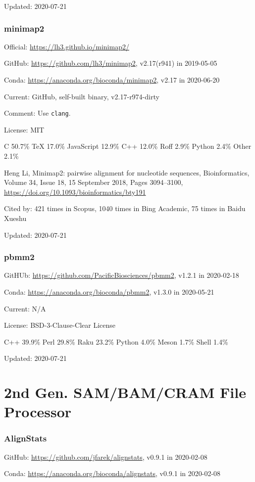 \documentclass[]{article}
\newcommand{\cb}[3]{\par Cited by: {\color{blue}\Huge #1} times in Scopus, {\color{blue}\Huge #2} times in Bing Academic, {\color{blue}\Huge #3} times in Baidu Xueshu}
\begin{document}
Updated: 2020-07-21

\section{minimap2}

Official: \url{https://lh3.github.io/minimap2/}

GitHub: \url{https://github.com/lh3/minimap2}, v2.17(r941) in 2019-05-05

Conda: \url{https://anaconda.org/bioconda/minimap2}, v2.17 in 2020-06-20

Current: GitHub, self-built binary, v2.17-r974-dirty

Comment: Use \verb|clang|.

License: MIT

C 50.7\% TeX 17.0\% JavaScript 12.9\% C++ 12.0\% Roff 2.9\% Python 2.4\% Other 2.1\%

Heng Li, Minimap2: pairwise alignment for nucleotide sequences, Bioinformatics, Volume 34, Issue 18, 15 September 2018, Pages 3094–3100, \url{https://doi.org/10.1093/bioinformatics/bty191}\cb{421}{1040}{75}

Updated: 2020-07-21

\section{pbmm2}

GitHUb: \url{https://github.com/PacificBiosciences/pbmm2}, v1.2.1 in 2020-02-18

Conda: \url{https://anaconda.org/bioconda/pbmm2}, v1.3.0 in 2020-05-21

Current: N/A

License: BSD-3-Clause-Clear License

C++ 39.9\% Perl 29.8\% Raku 23.2\% Python 4.0\% Meson 1.7\% Shell 1.4\%

Updated: 2020-07-21

\part{2nd Gen. SAM/BAM/CRAM File Processor}

\section{AlignStats}

GitHub: \url{https://github.com/jfarek/alignstats}, v0.9.1 in 2020-02-08

Conda: \url{https://anaconda.org/bioconda/alignstats}, v0.9.1 in 2020-02-08
\end{document}
